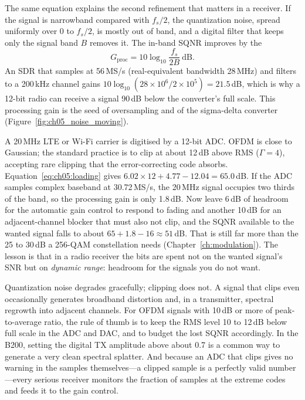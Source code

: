 The same equation explains the second refinement that matters in a receiver. If the signal is
narrowband compared with $f_s/2$, the quantization noise, spread uniformly over $0$ to $f_s/2$,
is mostly out of band, and a digital filter that keeps only the signal band $B$ removes it.
The in-band SQNR improves by the 
\begin{equation}
G_{\text{proc}}=10\log_{10}\frac{f_s}{2B}\ \text{dB}.
\label{eq:ch05:procgain}
\end{equation}
An SDR that samples at 56\,MS/s (real-equivalent bandwidth 28\,MHz) and filters to a 200\,kHz
channel gains $10\log_{10}(28\times10^6/2\times10^5)=21.5$\,dB, which is why a 12-bit radio can
receive a signal 90\,dB below the converter's full scale. This processing gain is the seed of
oversampling and of the sigma-delta converter (Figure~\ref{fig:ch05_noise_moving}).

\begin{worked}
A 20\,MHz LTE or Wi-Fi carrier is digitised by a 12-bit ADC. OFDM is close to Gaussian; the
standard practice is to clip at about 12\,dB above RMS ($\Gamma=4$), accepting rare clipping
that the error-correcting code absorbs. Equation~\eqref{eq:ch05:loading} gives
$6.02\times12+4.77-12.04=65.0$\,dB. If the ADC samples complex baseband at 30.72\,MS/s, the
20\,MHz signal occupies two thirds of the band, so the processing gain is only 1.8\,dB. Now
leave 6\,dB of headroom for the automatic gain control to respond to fading and another 10\,dB
for an adjacent-channel blocker that must also not clip, and the SQNR available to the wanted
signal falls to about $65+1.8-16\approx51$\,dB. That is still far more than the 25 to 30\,dB a
256-QAM constellation needs (Chapter~\ref{ch:modulation}). The lesson is that in a radio
receiver the bits are spent not on the wanted signal's SNR but on \emph{dynamic range}:
headroom for the signals you do not want.
\end{worked}

\begin{pitfall}[title=Clipping is worse than noise]
Quantization noise degrades gracefully; clipping does not. A signal that clips even
occasionally generates broadband distortion and, in a transmitter, spectral regrowth into
adjacent channels. For OFDM signals with 10\,dB or more of peak-to-average ratio, the rule of
thumb is to keep the RMS level 10 to 12\,dB below full scale in the ADC and DAC, and to budget
the lost SQNR accordingly. In the B200, setting the digital TX amplitude above about 0.7 is a
common way to generate a very clean spectral splatter. And because an ADC that clips gives
no warning in the samples themselves---a clipped sample is a perfectly valid number---every
serious receiver monitors the fraction of samples at the extreme codes and feeds it to the
gain control.
\end{pitfall}

